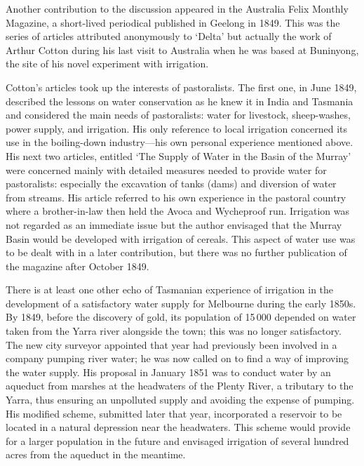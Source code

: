 Another contribution to the discussion appeared in the Australia Felix
Monthly Magazine, a short-lived periodical published in Geelong in
1849.  This was the series of articles attributed anonymously to
`Delta' but actually the work of Arthur Cotton during his last visit
to Australia when he was based at Buninyong, the site of his novel
experiment with irrigation.

Cotton's articles took up the interests of pastoralists.  The first
one, in June 1849, described the lessons on water conservation as he
knew it in India and Tasmania and considered the main needs of
pastoralists: water for livestock, sheep-washes, power supply, and
irrigation.  His only reference to local irrigation concerned its use
in the boiling-down industry---his own personal experience mentioned
above.  His next two articles, entitled `The Supply of Water in the
Basin of the Murray' were concerned mainly with detailed measures
needed to provide water for pastoralists: especially the excavation of
tanks (dams) and diversion of water from streams.  His article
referred to his own experience in the pastoral country where a
brother-in-law then held the Avoca and Wycheproof
run.  Irrigation was not
regarded as an immediate issue but the author envisaged that the
Murray Basin would be developed with irrigation of cereals.  This
aspect of water use was to be dealt with in a later contribution, but
there was no further publication of the magazine after October 1849.

There is at least one other echo of Tasmanian experience of irrigation
in the development of a satisfactory water supply for Melbourne during
the early 1850s.  By 1849, before the discovery of gold, its
population of 15\,000 depended on water taken from the Yarra river
alongside the town; this was no longer satisfactory.  The new city
surveyor appointed that year had previously been involved in a company
pumping river water; he was now called on to find a way of improving
the water supply.  His proposal in January 1851 was to conduct water
by an aqueduct from marshes at the headwaters of the Plenty River, a
tributary to the Yarra, thus ensuring an unpolluted supply and
avoiding the expense of pumping.  His modified scheme, submitted later
that year, incorporated a reservoir to be located in a natural
depression near the headwaters.  This scheme would provide for a
larger population in the future and envisaged irrigation of several
hundred acres from the aqueduct in the meantime.


